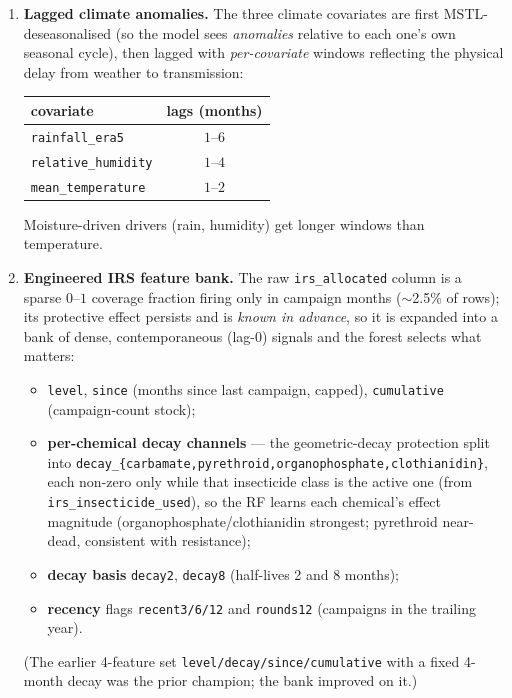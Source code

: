 \documentclass[11pt]{article}
\newcommand{\code}[1]{\texttt{\small #1}}
\begin{document}
\begin{enumerate}
\item \textbf{Lagged climate anomalies.} The three climate covariates are first
      MSTL-deseasonalised (so the model sees \emph{anomalies} relative to each one's own
      seasonal cycle), then lagged with \emph{per-covariate} windows reflecting the
      physical delay from weather to transmission:
      \begin{center}\small
      \begin{tabular}{@{}lc@{}}
      \toprule
      covariate & lags (months) \\ \midrule
      \code{rainfall\_era5} & $1\text{--}6$ \\
      \code{relative\_humidity} & $1\text{--}4$ \\
      \code{mean\_temperature} & $1\text{--}2$ \\
      \bottomrule
      \end{tabular}
      \end{center}
      Moisture-driven drivers (rain, humidity) get longer windows than temperature.

\item \textbf{Engineered IRS feature bank.} The raw \code{irs\_allocated} column is a sparse
      $0$--$1$ coverage fraction firing only in campaign months ($\sim$2.5\% of rows); its
      protective effect persists and is \emph{known in advance}, so it is expanded into a
      bank of dense, contemporaneous (lag-0) signals and the forest selects what matters:
      \begin{itemize}
      \item \code{level}, \code{since} (months since last campaign, capped),
            \code{cumulative} (campaign-count stock);
      \item \textbf{per-chemical decay channels} --- the geometric-decay protection split into
            \code{decay\_\{carbamate,pyrethroid,organophosphate,clothianidin\}}, each non-zero
            only while that insecticide class is the active one (from \code{irs\_insecticide\_used}),
            so the RF learns each chemical's effect magnitude (organophosphate/clothianidin
            strongest; pyrethroid near-dead, consistent with resistance);
      \item \textbf{decay basis} \code{decay2}, \code{decay8} (half-lives 2 and 8 months);
      \item \textbf{recency} flags \code{recent3/6/12} and \code{rounds12} (campaigns in the
            trailing year).
      \end{itemize}
      (The earlier 4-feature set \code{level/decay/since/cumulative} with a fixed 4-month decay
      was the prior champion; the bank improved on it.)


\end{enumerate}
\end{document}
